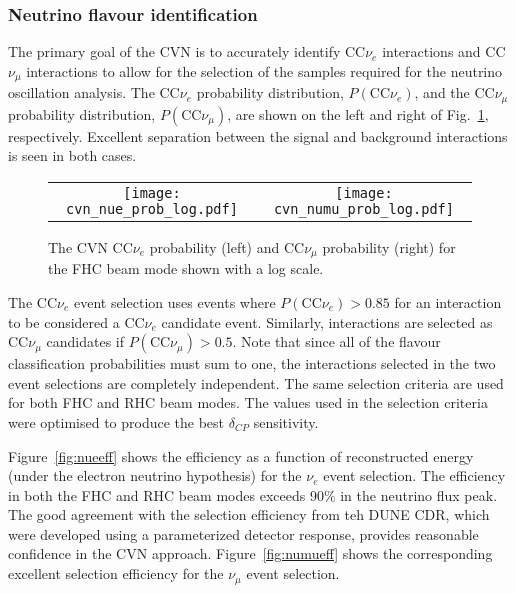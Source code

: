 \subsubsection{Neutrino flavour identification}
The primary goal of the CVN is to accurately identify CC$\nu_e$ interactions and CC$\nu_\mu$ interactions to allow for the selection of the samples required for the neutrino oscillation analysis. The CC$\nu_e$ probability distribution, $P(\textrm{CC}\nu_e)$, and the CC$\nu_\mu$ probability distribution, $P(\textrm{CC}\nu_\mu)$, are shown on the left and right of Fig.~\ref{fig:cvnprob}, respectively. Excellent separation between the signal and background interactions is seen in both cases.

\begin{figure}
    \centering
    \begin{tabular}{cc}
		\texttt{[image: cvn\_nue\_prob\_log.pdf]} &
		\texttt{[image: cvn\_numu\_prob\_log.pdf]} 
	\end{tabular}
	\caption{The CVN CC$\nu_e$ probability (left) and CC$\nu_\mu$ probability (right) for the FHC beam mode shown with a log scale.}
    \label{fig:cvnprob}
\end{figure}

The CC$\nu_e$ event selection uses events where $P(\textrm{CC}\nu_e) > 0.85$ for an interaction to be considered a CC$\nu_e$ candidate event. Similarly, interactions are selected as CC$\nu_\mu$ candidates if $P(\textrm{CC}\nu_\mu) > 0.5$. Note that since all of the flavour classification probabilities must sum to one, the interactions selected in the two event selections are completely independent. The same selection criteria are used for both FHC and RHC beam modes. The values used in the selection criteria were optimised to produce the best $\delta_{CP}$ sensitivity.

Figure~\ref{fig:nueeff} shows the efficiency as a function of reconstructed energy (under the electron neutrino hypothesis) for the $\nu_e$ event selection. The efficiency in both the FHC and RHC beam modes exceeds 90\% in the neutrino flux peak. The good agreement with the selection efficiency from teh DUNE CDR, which were developed using a parameterized detector response, provides reasonable confidence in the CVN approach. Figure~\ref{fig:numueff} shows the corresponding excellent selection efficiency for the $\nu_\mu$ event selection.

